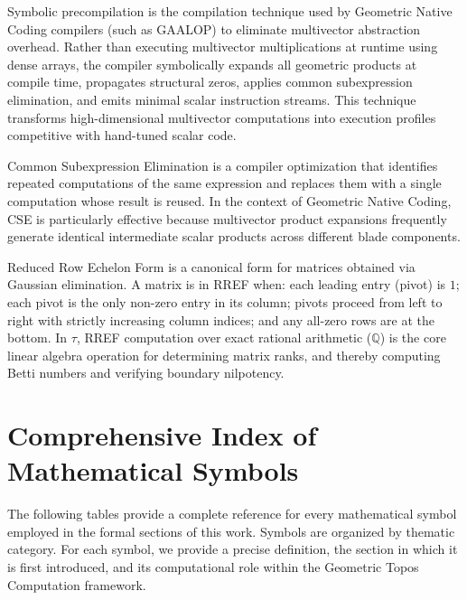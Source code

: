 \documentclass[manuscript, nonacm, review=false]{acmart}
\theoremstyle{definition}
\theoremstyle{plain}
\newcommand{\Q}{\mathbb{Q}}
\newcommand{\toposLang}{\ensuremath{\tau}\text{-Lang}}
\begin{document}
\begin{description}[style=unboxed, leftmargin=0cm, font=\bfseries]
\item[Symbolic Precompilation]
Symbolic precompilation is the compilation technique used by Geometric Native Coding compilers (such as GAALOP) to eliminate multivector abstraction overhead. Rather than executing multivector multiplications at runtime using dense arrays, the compiler symbolically expands all geometric products at compile time, propagates structural zeros, applies common subexpression elimination, and emits minimal scalar instruction streams. This technique transforms high-dimensional multivector computations into execution profiles competitive with hand-tuned scalar code.

\item[Common Subexpression Elimination (CSE)]
Common Subexpression Elimination is a compiler optimization that identifies repeated computations of the same expression and replaces them with a single computation whose result is reused. In the context of Geometric Native Coding, CSE is particularly effective because multivector product expansions frequently generate identical intermediate scalar products across different blade components.

\item[Reduced Row Echelon Form (RREF)]
Reduced Row Echelon Form is a canonical form for matrices obtained via Gaussian elimination. A matrix is in RREF when: each leading entry (pivot) is $1$; each pivot is the only non-zero entry in its column; pivots proceed from left to right with strictly increasing column indices; and any all-zero rows are at the bottom. In \toposLang{}, RREF computation over exact rational arithmetic ($\Q$) is the core linear algebra operation for determining matrix ranks, and thereby computing Betti numbers and verifying boundary nilpotency.

\end{description}



\section{Comprehensive Index of Mathematical Symbols}
\label{sec:symbols}

The following tables provide a complete reference for every mathematical symbol employed in the formal sections of this work. Symbols are organized by thematic category. For each symbol, we provide a precise definition, the section in which it is first introduced, and its computational role within the Geometric Topos Computation framework.
\end{document}
